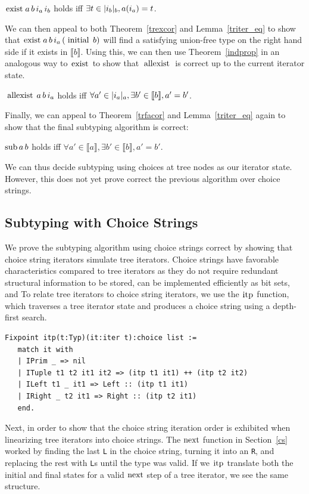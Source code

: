 \documentclass[a4paper,english]{lipics-v2019}
\newcommand{\denotes}[1]{\llbracket #1 \rrbracket}
\renewcommand{\L}{{\tt L}\xspace}
\newcommand{\Ls}{{\tt L}s\xspace}
\newcommand{\R}{{\tt R}\xspace}
\renewcommand{\c}[1]{\ensuremath{\text{\lstinline{#1}}}\xspace}
\begin{document}
\begin{theorem}\label{trexcor}
$\c{exist}\,a\,b\,i_a\,i_b$ holds iff $\exists t\in|i_b|_{b},a(i_a)= t$.
\end{theorem}

We can then appeal to both Theorem~\ref{trexcor} and Lemma~\ref{triter_eq}
to show that $\c{exist}\,a\,b\,i_a\,(\c{initial}\,b)$ will find a satisfying
union-free type on the right hand side if it exists in $\denotes{b}$. Using
this, we can then use Theorem~\ref{indprop} in an analogous way to \c{exist}
to show that \c{allexist} is correct up to the current iterator state.

\begin{theorem}\label{trfacor}
$\c{allexist}\,a\,b\,i_a$ holds iff $\forall a'\in \irch{i_a}{a},
  \exists b'\in \denotes{b}, a'= b'$.
\end{theorem}

Finally, we can appeal to Theorem~\ref{trfacor} and Lemma~\ref{triter_eq}
again to show that the final subtyping algorithm is correct:

\begin{theorem}\label{trsub}
$\c{sub}\,a\,b$ holds iff $\forall a' \in \denotes{a}, \exists b' \in
  \denotes{b}, a' = b'$.
\end{theorem}

We can thus decide subtyping using choices at tree nodes as our iterator
state.  However, this does not yet prove correct the previous algorithm over
choice strings.

\subsection{Subtyping with Choice Strings}

We prove the subtyping algorithm using choice strings correct by 
showing that choice string iterators simulate tree iterators. Choice strings
have favorable characteristics compared to tree iterators as they do not require
redundant structural information to be stored, can be implemented efficiently as 
bit sets, and  To 
relate tree iterators to choice string iterators, we use the \c{itp} 
function, which traverses a tree iterator state and produces a choice
string using a depth-first search.

\begin{small}\begin{lstlisting}
Fixpoint itp(t:Typ)(it:iter t):choice list :=
   match it with
   | IPrim _ => nil
   | ITuple t1 t2 it1 it2 => (itp t1 it1) ++ (itp t2 it2)
   | ILeft t1 _ it1 => Left :: (itp t1 it1)
   | IRight _ t2 it1 => Right :: (itp t2 it1)
   end.
\end{lstlisting}\end{small}
\noindent
Next, in order to show that the choice string iteration order
is exhibited when linearizing tree iterators into choice strings. 
The \c{next} function in Section~\ref{cs} worked by finding the last
\L in the choice string, turning it into an \R, and replacing the rest
with \Ls until the type was valid. If we \c{itp} translate both the initial
and final states for a valid \c{next} step of a tree iterator, we see the same
structure.
\end{document}
